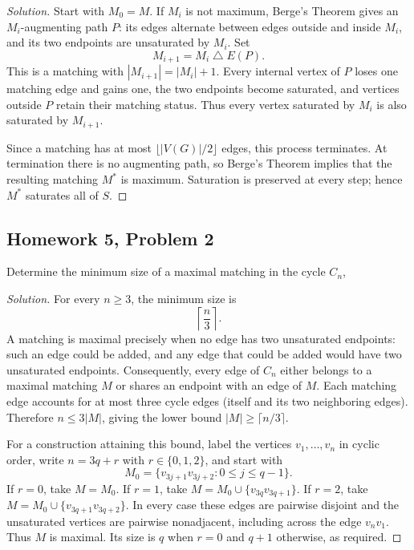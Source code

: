 \documentclass[12pt]{amsart}
\newenvironment{solution}{\begin{proof}[Solution]}{\end{proof}}
\begin{document}
    \begin{solution}
        Start with $M_0=M$. If $M_i$ is not maximum, Berge's Theorem
        gives an $M_i$-augmenting path $P$: its edges alternate between
        edges outside and inside $M_i$, and its two endpoints are
        unsaturated by $M_i$. Set
        \[
            M_{i+1}=M_i\mathbin{\triangle}E(P).
        \]
        This is a matching with $|M_{i+1}|=|M_i|+1$. Every internal
        vertex of $P$ loses one matching edge and gains one, the two
        endpoints become saturated, and vertices outside $P$ retain
        their matching status. Thus every vertex saturated by $M_i$
        is also saturated by $M_{i+1}$.

        Since a matching has at most $\lfloor |V(G)|/2\rfloor$ edges,
        this process terminates. At termination there is no augmenting
        path, so Berge's Theorem implies that the resulting matching
        $M^*$ is maximum. Saturation is preserved at every step; hence
        $M^*$ saturates all of $S$.
    \end{solution}

    \subsection*{Homework 5, Problem 2} Determine the minimum size of a maximal matching in the cycle $C_n$,

    \begin{solution}
        For every $n\geq 3$, the minimum size is
        \[
            \left\lceil\frac{n}{3}\right\rceil.
        \]
        A matching is maximal precisely when no edge has two
        unsaturated endpoints: such an edge could be added, and any
        edge that could be added would have two unsaturated endpoints.
        Consequently, every edge of $C_n$ either belongs to a maximal
        matching $M$ or shares an endpoint with an edge of $M$.
        Each matching edge accounts for at most three cycle edges
        (itself and its two neighboring edges). Therefore
        $n\leq 3|M|$, giving the lower bound
        $|M|\geq\lceil n/3\rceil$.

        For a construction attaining this bound, label the vertices
        $v_1,\ldots,v_n$ in cyclic order, write $n=3q+r$ with
        $r\in\{0,1,2\}$, and start with
        \[
            M_0=\{v_{3j+1}v_{3j+2}:0\leq j\leq q-1\}.
        \]
        If $r=0$, take $M=M_0$. If $r=1$, take
        $M=M_0\cup\{v_{3q}v_{3q+1}\}$. If $r=2$, take
        $M=M_0\cup\{v_{3q+1}v_{3q+2}\}$.
        In every case these edges are pairwise disjoint and the
        unsaturated vertices are pairwise nonadjacent, including
        across the edge $v_nv_1$. Thus $M$ is maximal. Its size is
        $q$ when $r=0$ and $q+1$ otherwise, as required.
    \end{solution}
\end{document}
